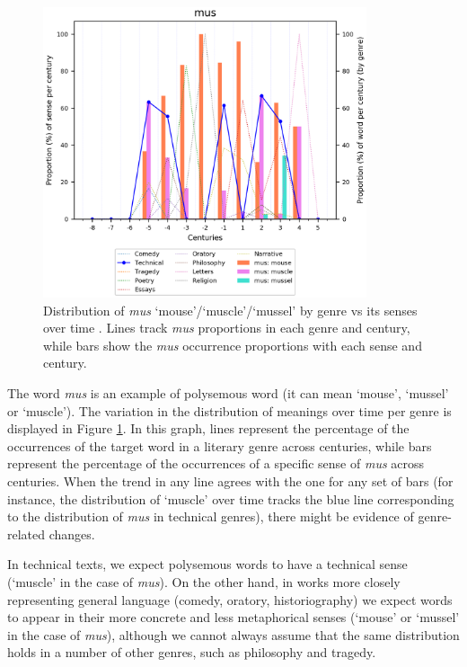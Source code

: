 \documentclass[output=paper]{langscibook}
\begin{document}
\begin{figure}
\includegraphics[width=0.85\textwidth]{figures/PERRONE_mus.png}
\caption{Distribution of \emph{mus} `mouse'/`muscle'/`mussel' by genre vs its senses over time \citep{perrone-etal-2019-gasc}. Lines track \emph{mus} proportions in each genre and century, while bars show the \emph{mus} occurrence proportions with each sense and century.\label{musvar}}
\end{figure}

The word \emph{mus} is an example of polysemous word (it can mean `mouse', `mussel' or `muscle'). The variation in the distribution of meanings over time per genre is displayed in Figure \ref{musvar}. In this graph, lines represent the percentage of the occurrences of the target word in a literary genre across centuries, while bars represent the percentage of the occurrences of a specific sense of \emph{mus} across centuries. When the trend in any line agrees with the one for any set of bars (for instance, the distribution of `muscle' over time tracks the blue line corresponding to the distribution of \emph{mus} in technical genres), there might be evidence of genre-related changes.

In technical texts, we expect polysemous words to have a technical sense (`muscle' in the case of \emph{mus}). On the other hand, in works more closely representing general language (comedy, oratory, historiography) we expect words to appear in their more concrete and less metaphorical senses (`mouse' or `mussel' in the case of \emph{mus}), although we cannot always assume that the same distribution holds in a number of other genres, such as philosophy and tragedy.
\end{document}
